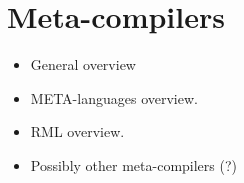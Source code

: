 \section{Meta-compilers}

\begin{itemize}[noitemsep]
	\item General overview
	\item META-languages overview.
	\item RML overview.
	\item Possibly other meta-compilers (?)
\end{itemize}



